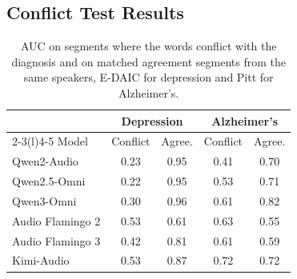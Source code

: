\documentclass{article}
\begin{document}

\subsection{Conflict Test Results}

\begin{table}[t]
\centering\small
\setlength{\tabcolsep}{4pt}
\caption{\small AUC on segments where the words conflict with the diagnosis and on matched agreement segments from the same speakers, E-DAIC \cite{daic} for depression and Pitt \cite{pitt} for Alzheimer's.}
\label{tab:conflict}
\begin{tabular*}{\columnwidth}{@{\extracolsep{\fill}}lcccc@{}}
\toprule
 & \multicolumn{2}{c}{Depression} & \multicolumn{2}{c}{Alzheimer's} \\
\cmidrule(lr){2-3}\cmidrule(l){4-5}
Model & Conflict & Agree. & Conflict & Agree. \\
\midrule
Qwen2-Audio \cite{qwen2audio}   & 0.23 & 0.95 & 0.41 & 0.70 \\
Qwen2.5-Omni \cite{qwen25omni}  & 0.22 & 0.95 & 0.53 & 0.71 \\
Qwen3-Omni \cite{qwen3omni}     & 0.30 & 0.96 & 0.61 & 0.82 \\
Audio Flamingo 2 \cite{af2}     & 0.53 & 0.61 & 0.63 & 0.55 \\
Audio Flamingo 3 \cite{af3}     & 0.42 & 0.81 & 0.61 & 0.59 \\
Kimi-Audio \cite{kimiaudio}     & 0.53 & 0.87 & 0.72 & 0.72 \\
\bottomrule
\end{tabular*}
\end{table}
\end{document}
